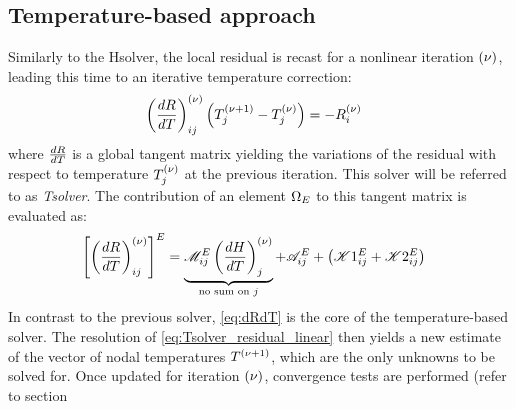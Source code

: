 \subsection{Temperature-based approach }
Similarly to the Hsolver, the local residual is recast for a nonlinear iteration ${\left( \nu \right)}$, 
leading this time to an iterative temperature correction:
\begin{align}
\label{eq:Tsolver_residual_linear}
& \left( \frac{dR}{dT} \right)^{{\left( \nu \right)}}_{ij} \left( T_j^{{\left( \nu+1 \right)}} - T_j^{{\left( \nu \right)}} \right) = -R_i^{{\left( \nu \right)}}
\end{align}
where $\frac{dR}{dT}$ is a global tangent matrix yielding the variations of the residual with respect to temperature $T_j^{{\left( \nu \right)}}$ at the previous iteration. 
This solver will be referred to as \emph{Tsolver}.
The contribution of an element $\Omega_E$ to this tangent matrix is evaluated as:
\begin{align}
\label{eq:dRdT}
& \left[ \left( \frac{dR}{dT} \right)_{ij}^{{\left( \nu \right)}} \right]^E
= \underbrace{\mathscr{M}_{ij}^E \left( \frac{dH}{dT} \right)^{{\left( \nu \right)}}_{j}}_{\text{no sum on }j}
+ \mathscr{A}_{ij}^E
+ \left( \mathscr{K}1_{ij}^E + \mathscr{K}2_{ij}^E \right)
\end{align}
In contrast to the previous solver, \cref{eq:dRdT} is the core of the temperature-based solver. The resolution of \cref{eq:Tsolver_residual_linear} 
then yields a new estimate of the vector of nodal temperatures $T^{{\left( \nu+1 \right)}}$, which are the only unknowns to be solved for. 
Once updated for iteration ${\left( \nu \right)}$, convergence tests are performed (refer to section %
%
%
